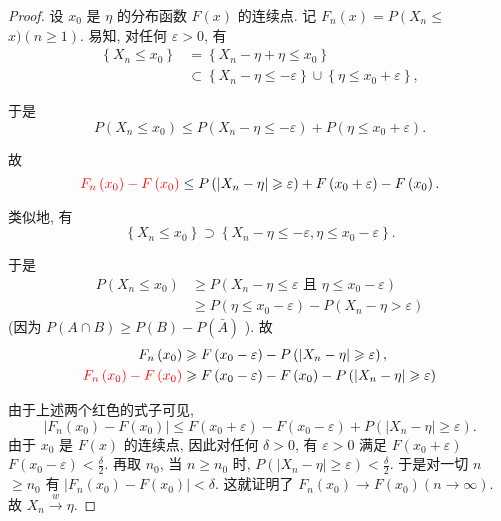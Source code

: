 \begin{proof}
    设 $x_0$ 是 $\eta$ 的分布函数 $F(x)$ 的连续点. 记 $F_n(x)=P\left(X_n \leq\right.$ $x)(n \geqslant 1)$. 易知, 对任何 $\varepsilon>0$, 有
$$
\begin{aligned}
\left\{X_n \leq x_0\right\} & =\left\{X_n-\eta+\eta \leq x_0\right\} \\
& \subset\left\{X_n-\eta \leq-\varepsilon\right\} \cup\left\{\eta \leq x_0+\varepsilon\right\},
\end{aligned}
$$

于是
$$
P\left(X_n \leq x_0\right) \leq P\left(X_n-\eta \leq-\varepsilon\right)+P\left(\eta \leq x_0+\varepsilon\right) .
$$

故$${{\color{red}F_n\left(x_0\right)-F\left(x_0\right)}} \leq P\left(\left|X_n-\eta\right| \geqslant \varepsilon\right)+F\left(x_0+\varepsilon\right)-F\left(x_0\right) .$$

类似地, 有
$$
\left\{X_n \leq x_0\right\} \supset\left\{X_n-\eta \leq-\varepsilon, \eta \leq x_0-\varepsilon\right\} .
$$

于是$$
\begin{aligned}
P\left(X_n \leq x_0\right) & \geqslant P\left(X_n-\eta \leq \varepsilon \text { 且 } \eta \leq x_0-\varepsilon\right) \\
& \geqslant P\left(\eta \leq x_0-\varepsilon\right)-P\left(X_n-\eta>\varepsilon\right)
\end{aligned}
$$
(因为 $P(A \cap B) \geqslant P(B)-P(\bar{A})$ ).
故
$$
\begin{aligned}
F_n\left(x_0\right) & \geqslant F\left(x_0-\varepsilon\right)-P\left(\left|X_n-\eta\right| \geqslant \varepsilon\right), \\
\color{red}F_n\left(x_0\right)-F\left(x_0\right) & \geqslant F\left(x_0-\varepsilon\right)-F\left(x_0\right)-P\left(\left|X_n-\eta\right| \geqslant \varepsilon\right)
\end{aligned}
$$

由于上述两个红色的式子可见, $$
\left|F_n\left(x_0\right)-F\left(x_0\right)\right| \leq F\left(x_0+\varepsilon\right)-F\left(x_0-\varepsilon\right)+P\left(\left|X_n-\eta\right| \geqslant \varepsilon\right) .
$$
由于 $x_0$ 是 $F(x)$ 的连续点, 因此对任何 $\delta>0$, 有 $\varepsilon>0$ 满足 $F\left(x_0+\varepsilon\right)$ $F\left(x_0-\varepsilon\right)<\frac{\delta}{2}$. 再取 $n_0$, 当 $n \geqslant n_0$ 时, $P\left(\left|X_n-\eta\right| \geqslant \varepsilon\right)<\frac{\delta}{2}$. 于是对一切 $n$ $\geqslant n_0$ 有 $\left|F_n\left(x_0\right)-F\left(x_0\right)\right|<\delta$. 这就证明了 $F_n\left(x_0\right) \rightarrow F\left(x_0\right)(n \rightarrow \infty)$. 故 $X_n \stackrel{w}{\longrightarrow} \eta$.
\end{proof}

